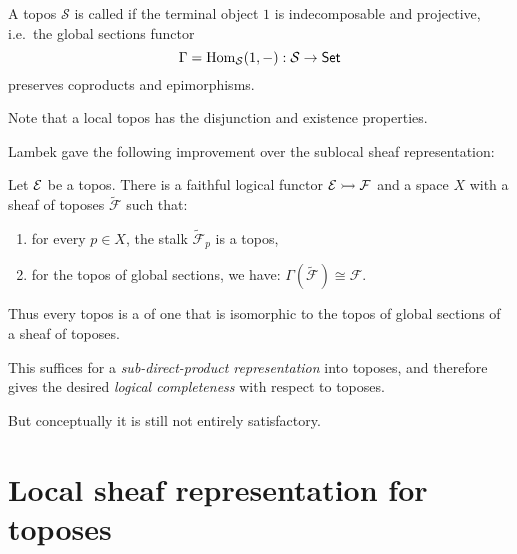 \documentclass[lambek.tex]{subfiles}
\begin{document}
\begin{definition}
A topos $\mathcal{S}$ is called  if the terminal object $1$ is indecomposable and projective, i.e.\ the global sections functor 
\[
\Gamma = \mathrm{Hom}_\mathcal{S}(1, - ) : \mathcal{S} \to \mathsf{Set}
\]
preserves coproducts and epimorphisms.
\end{definition}
\medskip

Note that a local topos has  the disjunction and existence properties.


Lambek gave the following improvement over the sublocal sheaf representation:

\begin{theorem}[Lambek 1989]
Let $\mathcal{E}$ be a topos.  
There is a faithful logical functor $\mathcal{E}\rightarrowtail\mathcal{F}$ 
and a space $X$ with a sheaf of toposes 
$\tilde{\mathcal{F}}$ such that:
\begin{enumerate}
\item for every $p\in X$, the stalk $\tilde{\mathcal{F}}_p$ is a  topos, 
\item for the topos of global sections, we have: $\Gamma(\tilde{\mathcal{F}}) \cong \mathcal{F}$.
\end{enumerate}
Thus every topos is a  of one that is isomorphic to the topos of global sections of a sheaf of  toposes.  
\end{theorem}
\medskip

This suffices for a \emph{sub-direct-product representation} into  toposes, and therefore gives the desired \emph{logical completeness} with respect to  toposes.  

But conceptually it is still not entirely satisfactory.

\section{Local sheaf representation for toposes}
\end{document}
